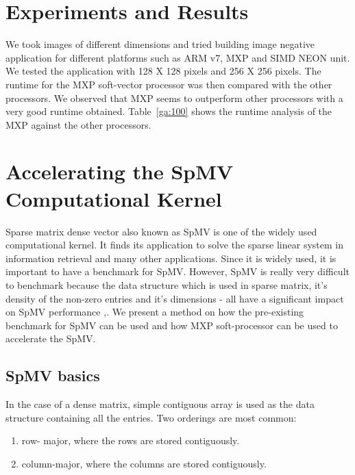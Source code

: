 %

\section{Experiments and Results}

We took images of different dimensions and tried building image negative application for different platforms such as ARM v7, MXP and SIMD NEON unit. We tested the application with 128 X 128 pixels and 256 X 256 pixels. The runtime for the MXP soft-vector processor was then compared with the other processors. We observed that MXP seems to outperform other processors with a very good runtime obtained.  Table~\ref{ga:100} shows the runtime analysis of the MXP against the other processors.





\section{Accelerating the SpMV Computational Kernel}

Sparse matrix dense vector also known as SpMV is one of the widely used computational kernel. It finds its application to solve the sparse linear system in information retrieval and many other applications. Since it is widely used, it is important to have a benchmark for SpMV. However, SpMV is really very difficult to benchmark because the data structure which is used in sparse matrix, it's density of the non-zero entries and it's dimensions - all have a significant impact on SpMV performance \cite{25},\cite{26}. We present a method on how the pre-existing benchmark for SpMV can be used and how MXP soft-processor can be used to accelerate the SpMV.

\subsection{SpMV basics}
	
In the case of a dense matrix, simple contiguous array is used as the data structure containing all the entries. Two orderings are most common: 
\begin{enumerate}

	\item row- major, where the rows are stored contiguously.
	\item column-major, where the columns are stored contiguously.
 
\end{enumerate}

